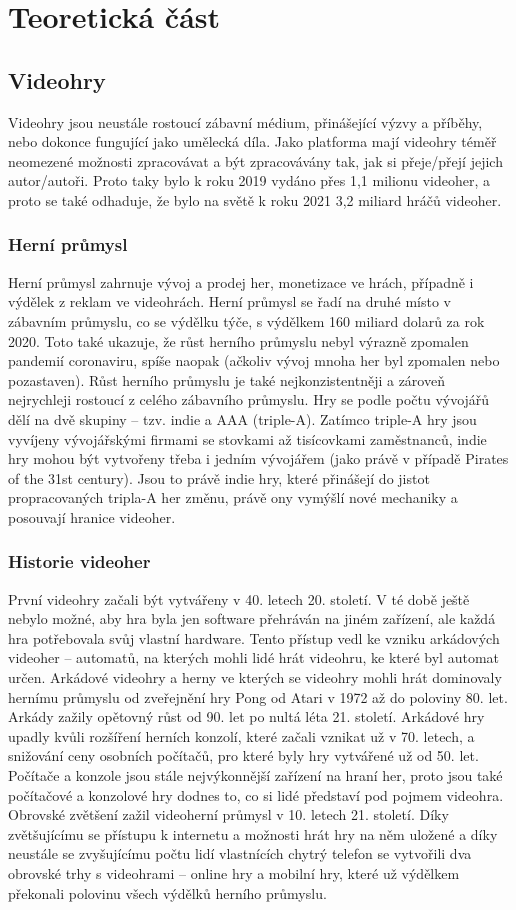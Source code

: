 \documentclass{article}
\begin{document}
\setcounter{page}{3}
\setcounter{section}{1}
\section{Teoretická část}
\subsection{Videohry}
Videohry jsou neustále rostoucí zábavní médium, přinášející výzvy a příběhy, nebo dokonce fungující jako umělecká díla. Jako platforma mají videohry téměř neomezené možnosti zpracovávat a být zpracovávány tak, jak si přeje/přejí jejich autor/autoři. Proto taky bylo k roku 2019 vydáno přes 1,1 milionu videoher, a proto se také odhaduje, že bylo na světě k roku 2021 3,2 miliard hráčů videoher.
\subsubsection{Herní průmysl}
Herní průmysl zahrnuje vývoj a prodej her, monetizace ve hrách, případně i výdělek z reklam ve videohrách.
Herní průmysl se řadí na druhé místo v zábavním průmyslu, co se výdělku týče, s výdělkem 160 miliard dolarů za rok 2020. Toto také ukazuje, že růst herního průmyslu nebyl výrazně zpomalen pandemií coronaviru, spíše naopak (ačkoliv vývoj mnoha her byl zpomalen nebo pozastaven). Růst herního průmyslu je také nejkonzistentněji a zároveň nejrychleji rostoucí z celého zábavního průmyslu.
Hry se podle počtu vývojářů dělí na dvě skupiny – tzv. indie a AAA (triple-A). Zatímco triple-A hry jsou vyvíjeny vývojářskými firmami se stovkami až tisícovkami zaměstnanců, indie hry mohou být vytvořeny třeba i jedním vývojářem (jako právě v případě Pirates of the 31st century). Jsou to právě indie hry, které přinášejí do jistot propracovaných tripla-A her změnu, právě ony vymýšlí nové mechaniky a posouvají hranice videoher.
\subsubsection{Historie videoher}
První videohry začali být vytvářeny v 40. letech 20. století. V té době ještě nebylo možné, aby hra byla jen software přehráván na jiném zařízení, ale každá hra potřebovala svůj vlastní hardware. Tento přístup vedl ke vzniku arkádových videoher – automatů, na kterých mohli lidé hrát videohru, ke které byl automat určen. Arkádové videohry a herny ve kterých se videohry mohli hrát dominovaly hernímu průmyslu od zveřejnění hry Pong od Atari v 1972 až do poloviny 80. let. Arkády zažily opětovný růst od 90. let po nultá léta 21. století.
Arkádové hry upadly kvůli rozšíření herních konzolí, které začali vznikat už v 70. letech, a snižování ceny osobních počítačů, pro které byly hry vytvářené už od 50. let. Počítače a konzole jsou stále nejvýkonnější zařízení na hraní her, proto jsou také počítačové a konzolové hry dodnes to, co si lidé představí pod pojmem videohra.
Obrovské zvětšení zažil videoherní průmysl v 10. letech 21. století. Díky zvětšujícímu se přístupu k internetu a možnosti hrát hry na něm uložené a díky neustále se zvyšujícímu počtu lidí vlastnících chytrý telefon se vytvořili dva obrovské trhy s videohrami – online hry a mobilní hry, které už výdělkem překonali polovinu všech výdělků herního průmyslu.
\end{document}
